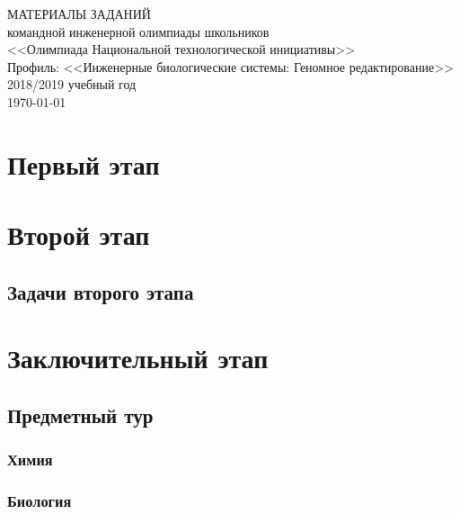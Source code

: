 \documentclass[a4paper,12pt,oneside]{book}
\begin{document}
\begin{titlepage}
    \begin{center}
        \huge{МАТЕРИАЛЫ ЗАДАНИЙ} \\
        \Large{командной инженерной олимпиады школьников} \\
        \Large{<<Олимпиада Национальной технологической инициативы>>} \\
        \Large{Профиль: <<Инженерные биологические системы: Геномное редактирование>>} \\
        \large{2018/2019 учебный год} \\
        \vspace{2cm}
        \Large{\today}  
    \end{center}
\end{titlepage}

\setcounter{tocdepth}{1}

\tableofcontents

\part{Первый этап}




\part{Второй этап}
\clearpage
\chapter{Задачи второго этапа}



\part{Заключительный этап}

\clearpage
\chapter{Предметный тур}

\section{Химия}


\section{Биология}

\end{document}
